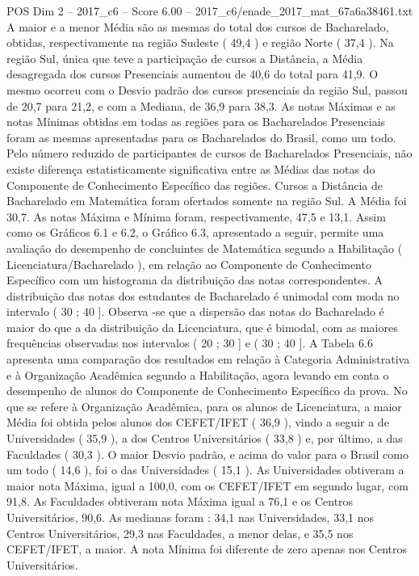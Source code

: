 \begin{textsample}{POS Dim 2 – 2017\_c6 – Score 6.00 – 2017\_c6/enade\_2017\_mat\_67a6a38461.txt}
A maior e a menor Média são as mesmas do total dos cursos de Bacharelado, obtidas, respectivamente na região Sudeste ( 49,4 ) e região Norte ( 37,4 ).
Na região Sul, única que teve a participação de cursos a Distância, a Média desagregada dos cursos Presenciais aumentou de 40,6 do total para 41,9.
O mesmo ocorreu com o Desvio padrão dos cursos presenciais da região Sul, passou de 20,7 para 21,2, e com a Mediana, de 36,9 para 38,3.
As notas Máximas e as notas Mínimas obtidas em todas as regiões para os Bacharelados Presenciais foram as mesmas apresentadas para os Bacharelados do Brasil, como um todo.
Pelo número reduzido de participantes de cursos de Bacharelados Presenciais, não existe diferença estatisticamente significativa entre as Médias das notas do Componente de Conhecimento Específico das regiões.
Cursos a Distância de Bacharelado em Matemática foram ofertados somente na região Sul.
A Média foi 30,7.
As notas Máxima e Mínima foram, respectivamente, 47,5 e 13,1.
Assim como os Gráficos 6.1 e 6.2, o Gráfico 6.3, apresentado a seguir, permite uma avaliação do desempenho de concluintes de Matemática segundo a Habilitação ( Licenciatura/Bacharelado ), em relação ao Componente de Conhecimento Específico com um histograma da distribuição das notas correspondentes.
A distribuição das notas dos estudantes de Bacharelado é unimodal com moda no intervalo ( 30 ; 40 ].
Observa -se que a dispersão das notas do Bacharelado é maior do que a da distribuição da Licenciatura, que é bimodal, com as maiores frequências observadas nos intervalos ( 20 ; 30 ] e ( 30 ; 40 ].
A Tabela 6.6 apresenta uma comparação dos resultados em relação à Categoria Administrativa e à Organização Acadêmica segundo a Habilitação, agora levando em conta o desempenho de alunos do Componente de Conhecimento Específico da prova.
No que se refere à Organização Acadêmica, para os alunos de Licenciatura, a maior Média foi obtida pelos alunos dos CEFET/IFET ( 36,9 ), vindo a seguir a de Universidades ( 35,9 ), a dos Centros Universitários ( 33,8 ) e, por último, a das Faculdades ( 30,3 ).
O maior Desvio padrão, e acima do valor para o Brasil como um todo ( 14,6 ), foi o das Universidades ( 15,1 ).
As Universidades obtiveram a maior nota Máxima, igual a 100,0, com os CEFET/IFET em segundo lugar, com 91,8.
As Faculdades obtiveram nota Máxima igual a 76,1 e os Centros Universitários, 90,6.
As medianas foram : 34,1 nas Universidades, 33,1 nos Centros Universitários, 29,3 nas Faculdades, a menor delas, e 35,5 nos CEFET/IFET, a maior.
A nota Mínima foi diferente de zero apenas nos Centros Universitários.

\end{textsample}
